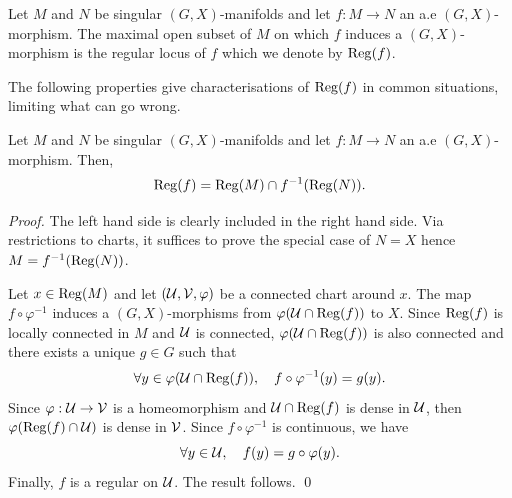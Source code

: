                 \begin{defi}\label{def:singular_manifolds_morphism_maximal} Let $M$ and $N$ be singular $(G,X)$-manifolds and let $f:M\rightarrow N$ an a.e $(G,X)$-morphism.
                The maximal open subset of $M$ on which $f$ induces a $(G,X)$-morphism is the regular locus of $f$ which we denote by $\mathrm{Reg}(f)$.
                \end{defi}

                The following properties give characterisations of $\mathrm{Reg}(f)$ in common situations, limiting what can go wrong.
                    \begin{lem}\label{lem:regf1}
                     Let $M$ and $N$ be  singular $(G,X)$-manifolds and let $f:M\rightarrow N$ an a.e $(G,X)$-morphism. Then, 
                     $$\mathrm{Reg}(f)=\mathrm{Reg}(M)\cap f^{-1}(\mathrm{Reg}(N)).$$
                    \end{lem}
                    \begin{proof}
                     The left hand side is clearly included in the right hand side.                   
                     Via restrictions to charts, it suffices to prove the special case of $N=X$ hence $M=f^{-1}(\mathrm{Reg}(N))$.
                    
                     Let $x\in \mathrm{Reg}(M)$ and let $(\mathcal{U},\mathcal V,\varphi)$ be a connected chart around $x$. The map $f\circ\varphi^{-1}$ induces a $(G,X)$-morphisms from $\varphi(\mathcal{U}\cap\mathrm{Reg}(f))$ to $X$. Since $\mathrm{Reg}(f)$ is locally connected in $M$ and $\mathcal{U}$ is connected, $\varphi(\mathcal{U}\cap\mathrm{Reg}(f))$ is also connected and there exists a unique $g\in G$ such that $$\forall y\in \varphi(\mathcal{U}\cap\mathrm{Reg}(f)),\quad  f\circ \varphi^{-1}(y)=g(y).$$
                     Since $\varphi:\mathcal{U}\rightarrow \mathcal V$ is a homeomorphism and $\mathcal{U}\cap\mathrm{Reg}(f)$ is dense in $\mathcal{U}$, then  $\varphi(\mathrm{Reg}(f)\cap \mathcal{U})$ is dense in $\mathcal V$. Since $f\circ \varphi^{-1}$ is continuous, we have
                     $$\forall y\in \mathcal{U},\quad  f(y)=g\circ \varphi(y).$$
                     Finally, $f$ is a regular on $\mathcal{U}$. The result follows.
                    \qed\end{proof}
       

